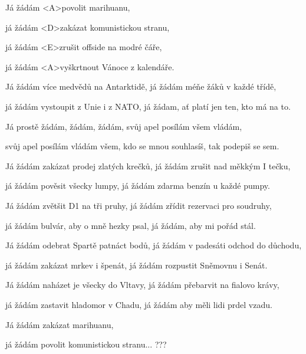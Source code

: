 

\zs
Já žádám <A>povolit marihuanu,

já žádám <D>zakázat komunistickou stranu,

já žádám <E>zrušit offside na modré čáře,

já žádám <A>vyškrtnout Vánoce z kalendáře.
\ks

\zs
Já žádám více medvědů na Antarktidě, já žádám méňe žáků v každé třídě,

já žádám vystoupit z Unie i z NATO, já žádam, ať platí jen ten, kto má na to.
\ks

\zr
Já prostě žádám, žádám, žádám, svůj apel posílám všem vládám,

svůj apel posílám vládám všem, kdo se mnou souhlasíš, tak podepiš se sem.
\kr

\zs
Já žádám zakázat prodej zlatých krečků, já žádám zrušit nad měkkým I tečku,

já žádám pověsit všecky lumpy, já žádám zdarma benzín u každé pumpy.
\ks

\zs
Já žádám zvětšit D1 na tři pruhy, já žádám zřídit rezervaci pro soudruhy,

já žádám bulvár, aby o mně hezky psal, já žádám, aby mi pořád stál.
\ks

\zr\kr

\zs
Já žádám odebrat Spartě patnáct bodů, já žádám v padesáti odchod do důchodu,

já žádám zakázat mrkev i špenát, já žádám rozpustit Sněmovnu i Senát.
\ks

\zs
Já žádám naházet je všecky do Vltavy, já žádám přebarvit na fialovo krávy,

já žádám zastavit hladomor v Chadu, já žádám aby měli lidi prdel vzadu.
\ks

\zr\kr

\zs
Já žádám zakázat marihuanu,

já žádám povolit komunistickou stranu... ???
\ks

\kp
